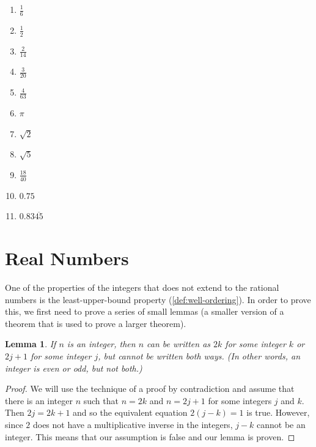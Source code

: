 \documentclass[
]{book}
\providecommand{\tightlist}{%
  \setlength{\itemsep}{0pt}\setlength{\parskip}{0pt}}
\newtheorem{lemma}{Lemma}[chapter]
\theoremstyle{definition}
\theoremstyle{definition}
\theoremstyle{definition}
\theoremstyle{remark}
\begin{document}
\begin{enumerate}
  \begin{enumerate}
  \def\labelenumii{\alph{enumii}.}
  \tightlist
  \item
    \(\frac{1}{6}\)
  \item
    \(\frac{1}{2}\)
  \item
    \(\frac{2}{14}\)
  \item
    \(\frac{3}{20}\)
  \item
    \(\frac{4}{63}\)
  \item
    \(\pi\)
  \item
    \(\sqrt{2}\)
  \item
    \(\sqrt{5}\)
  \item
    \(\frac{18}{40}\)
  \item
    \(0.75\)
  \item
    \(0.83\overline{45}\)
  \end{enumerate}
\end{enumerate}

\hypertarget{sec:reals}{%
\section{Real Numbers}\label{sec:reals}}

One of the properties of the integers that does not extend to the rational numbers is the least-upper-bound property (\ref{def:well-ordering}). In order to prove this, we first need to prove a series of small lemmas (a smaller version of a theorem that is used to prove a larger theorem).

\begin{lemma}
\protect\hypertarget{lem:unnamed-chunk-106}{}{\label{lem:unnamed-chunk-106} }If \(n\) is an integer, then \(n\) can be written as \(2k\) for some integer \(k\) or \(2j+1\) for some integer \(j\), but cannot be written both ways. (In other words, an integer is even or odd, but not both.)
\end{lemma}

\begin{proof}
{}We will use the technique of a proof by contradiction and assume that there is an integer \(n\) such that \(n=2k\) and \(n=2j+1\) for some integers \(j\) and \(k\). Then \(2j=2k+1\) and so the equivalent equation \(2(j-k)=1\) is true. However, since \(2\) does not have a multiplicative inverse in the integers, \(j-k\) cannot be an integer. This means that our assumption is false and our lemma is proven.
\end{proof}
\end{document}

